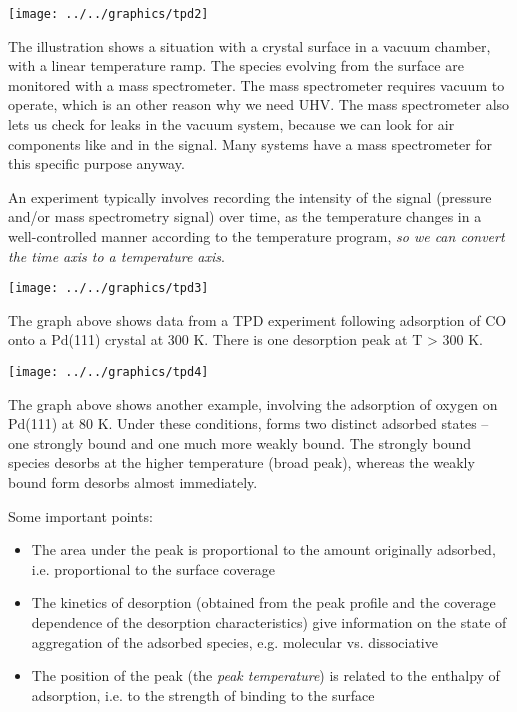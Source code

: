 \documentclass[ignorenonframetext]{beamer}
\begin{document}
\begin{center}\texttt{[image: ../../graphics/tpd2]}\end{center}

The illustration shows a situation with a crystal surface in a vacuum chamber, with a linear temperature ramp. The species evolving from the surface are monitored with a mass spectrometer. The mass spectrometer requires vacuum to operate, which is an other reason why we need UHV. The mass spectrometer also lets us check for leaks in the vacuum system, because we can look for air components like  and  in the signal. Many systems have a mass spectrometer for this specific purpose anyway.

\medskip An experiment typically involves recording the intensity of the signal (pressure and/or mass spectrometry signal) over time, as the temperature changes in a well-controlled manner according to the temperature program, \textit{so we can convert the time axis to a temperature axis}.

\begin{center}\texttt{[image: ../../graphics/tpd3]}\end{center}

The graph above shows data from a TPD experiment following adsorption of CO onto a Pd(111) crystal at 300 K. There is one desorption peak at T > 300 K.

\begin{center}\texttt{[image: ../../graphics/tpd4]}\end{center}

The graph above shows another example, involving the adsorption of oxygen on Pd(111) at 80 K. Under these conditions,  forms two distinct adsorbed states -- one strongly bound and one much more weakly bound. The strongly bound species desorbs at the higher temperature (broad peak), whereas the weakly bound form desorbs almost immediately.

Some important points:

\begin{itemize}
\item The area under the peak is proportional to the amount originally adsorbed, i.e. proportional to the surface coverage
\item The kinetics of desorption (obtained from the peak profile and the coverage dependence of the desorption characteristics) give information on the state of aggregation of the adsorbed species, e.g. molecular vs. dissociative
\item The position of the peak (the \textit{peak temperature}) is related to the enthalpy of adsorption, i.e. to the strength of binding to the surface
\end{itemize}
\end{document}
